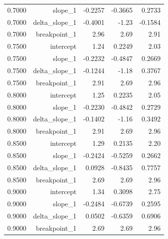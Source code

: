 \begin{longtable}{lrrrr}
  0.7000 & slope\_1 & -0.2257 & -0.3665 & 0.2733 \\
  0.7000 & delta\_slope\_1 & -0.4001 & -1.23 & -0.1584 \\
  0.7000 & breakpoint\_1 & 2.96 & 2.69 & 2.91 \\
  0.7500 & intercept & 1.24 & 0.2249 & 2.03 \\
  0.7500 & slope\_1 & -0.2232 & -0.4847 & 0.2669 \\
  0.7500 & delta\_slope\_1 & -0.1244 & -1.18 & 0.3767 \\
  0.7500 & breakpoint\_1 & 2.91 & 2.69 & 2.96 \\
  0.8000 & intercept & 1.25 & 0.2235 & 2.05 \\
  0.8000 & slope\_1 & -0.2230 & -0.4842 & 0.2729 \\
  0.8000 & delta\_slope\_1 & -0.1402 & -1.16 & 0.3492 \\
  0.8000 & breakpoint\_1 & 2.91 & 2.69 & 2.96 \\
  0.8500 & intercept & 1.29 & 0.2135 & 2.20 \\
  0.8500 & slope\_1 & -0.2424 & -0.5259 & 0.2662 \\
  0.8500 & delta\_slope\_1 & 0.0928 & -0.8435 & 0.7757 \\
  0.8500 & breakpoint\_1 & 2.69 & 2.69 & 2.96 \\
  0.9000 & intercept & 1.34 & 0.3098 & 2.75 \\
  0.9000 & slope\_1 & -0.2484 & -0.6739 & 0.2595 \\
  0.9000 & delta\_slope\_1 & 0.0502 & -0.6359 & 0.6906 \\
  0.9000 & breakpoint\_1 & 2.69 & 2.69 & 2.96 \\
\end{longtable}
